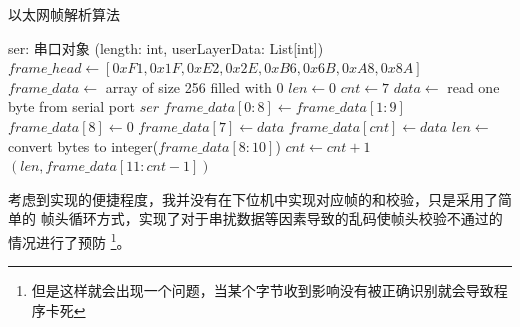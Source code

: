     \begin{algorithm}[H]
    \caption{以太网帧解析算法}
    \label{algorithm::UART}
    \begin{algorithmic}[1]
    \renewcommand{\algorithmicrequire}{\textbf{Input:}}
    \renewcommand{\algorithmicensure}{\textbf{Output:}}
    \Require ser: 串口对象
    \Ensure (length: int, userLayerData: List[int]) 
        \State $frame\_head \gets [0xF1, 0x1F, 0xE2, 0x2E, 0xB6, 0x6B, 0xA8, 0x8A]$ 
        \State $frame\_data \gets$ array of size 256 filled with 0 
        \State $len \gets 0$
        \State $cnt \gets 7$ 
            \State $data \gets$ read one byte from serial port $ser$ 
                \State $frame\_data[0:8] \gets frame\_data[1:9]$
                \State $frame\_data[8] \gets 0$ 
                \State $frame\_data[7] \gets data$
            \EndIf
                \State $frame\_data[cnt] \gets data$
                    \State $len \gets$ convert bytes to integer($frame\_data[8:10]$)
                \EndIf
                \State $cnt \gets cnt + 1$
            \EndIf
             
                \State \Return $(len, frame\_data[11:cnt-1])$ 
            \EndIf
        \EndWhile
    \EndFunction
    \end{algorithmic}
    \end{algorithm}
    
    考虑到实现的便捷程度，我并没有在下位机中实现对应帧的和校验，只是采用了简单的
    帧头循环方式，实现了对于串扰数据等因素导致的乱码使帧头校验不通过的情况进行了预防
    \footnote{但是这样就会出现一个问题，当某个字节收到影响没有被正确识别就会导致程序卡死}。
